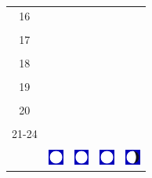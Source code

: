 \documentclass[twoside, a4paper,12pt, tikz]{scrartcl}
\begin{document}
\begin{tabularx}{\linewidth}{|c|X|X|p{2cm}|p{2cm}|}
            &   &       &    &   \\
          \hline
          16&   &                 &    &   \\
            &   &       &    &   \\
          \hline
          17&   &                 &    &   \\
            &   &       &    &   \\
          \hline
          18&   &                 &    &   \\
            &   &       &    &   \\
          \hline
          19&   &                 &     &   \\
            &   &       &    &   \\
          \hline
          20&   &              &    &   \\
            &   &       &    &   \\
          \hline 
          21-24&   &              &    &   \\
            &   &       &    &   \\
          \hline
                      & \vspace{0.01cm} \centerline{\includegraphics[width=0.5cm]{moon_phases/Moon_phase_4.svg.png}} \vspace{0.1cm} & \vspace{0.01cm} \centerline{\includegraphics[width=0.5cm]{moon_phases/Moon_phase_4.svg.png}} \vspace{0.1cm} & \vspace{0.01cm} \centerline{\includegraphics[width=0.5cm]{moon_phases/Moon_phase_4.svg.png}} \vspace{0.1cm} & \vspace{0.01cm} \centerline{\includegraphics[width=0.5cm]{moon_phases/Moon_phase_5.svg.png}} \vspace{0.1cm}\\
          \hline    
        \end{tabularx}
\end{document}
